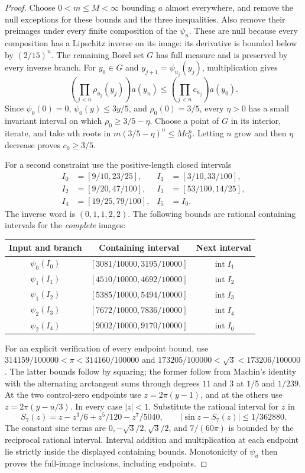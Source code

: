 \documentclass[11pt,reqno]{amsart}
\numberwithin{equation}{section}
\theoremstyle{definition}
\newcommand{\intr}{\operatorname{int}}
\begin{document}
\begin{proof}
Choose $0<m\le M<\infty$ bounding $a$ almost everywhere, and
remove the null exceptions for these bounds and the three inequalities.
Also remove their preimages under every finite composition of the
$\psi_u$. These are null because every composition has a Lipschitz
inverse on its image: its derivative is bounded below by
$(2/15)^n$. The remaining Borel set $G$ has full measure and is
preserved by every inverse branch. For $y_0\in G$ and
$y_{j+1}=\psi_{u_j}(y_j)$, multiplication gives
\begin{equation}\label{eq:density-iterate}
 \left(\prod_{j<n}\rho_{u_j}(y_j)\right)a(y_n)
 \le\left(\prod_{j<n}c_{u_j}\right)a(y_0).
\end{equation}
Since $\psi_0(0)=0$, $\psi_0(y)\le3y/5$, and
$\rho_0(0)=3/5$, every $\eta>0$ has a small invariant interval
on which $\rho_0\ge3/5-\eta$. Choose a point of $G$ in its
interior, iterate, and take $n$th roots in
$m(3/5-\eta)^n\le Mc_0^n$. Letting $n$ grow and then
$\eta$ decrease proves $c_0\ge3/5$.

For a second constraint use the positive-length closed intervals
\begin{align*}
 I_0&=[9/10,23/25],& I_1&=[3/10,33/100],\\
 I_2&=[9/20,47/100],& I_3&=[53/100,14/25],\\
 I_4&=[19/25,79/100],& I_5&=I_0.
\end{align*}
The inverse word is $(0,1,1,2,2)$. The following bounds are
rational containing intervals for the \emph{complete} images:
\begin{center}
\begin{tabular}{ccc}
\toprule
Input and branch&Containing interval&Next interval\\
\midrule
$\psi_0(I_0)$&$[3081/10000,3195/10000]$&$\intr I_1$\\
$\psi_1(I_1)$&$[4510/10000,4692/10000]$&$\intr I_2$\\
$\psi_1(I_2)$&$[5385/10000,5494/10000]$&$\intr I_3$\\
$\psi_2(I_3)$&$[7672/10000,7836/10000]$&$\intr I_4$\\
$\psi_2(I_4)$&$[9002/10000,9170/10000]$&$\intr I_0$\\
\bottomrule
\end{tabular}
\end{center}
For an explicit verification of every endpoint bound, use
$314159/100000<\pi<314160/100000$ and
$173205/100000<\sqrt3<173206/100000$.
The latter bounds follow by squaring; the former follow from
Machin's identity with the alternating arctangent sums through
degrees $11$ and $3$ at $1/5$ and $1/239$.
At the two control-zero endpoints use $z=2\pi(y-1)$, and at
the others use $z=2\pi(y-u/3)$. In every case $|z|<1$.
Substitute the rational interval for $z$ in
\[
 S_7(z)=z-z^3/6+z^5/120-z^7/5040,\qquad
 |\sin z-S_7(z)|\le1/362880.
\]
The constant sine terms are $0,-\sqrt3/2,\sqrt3/2$, and
$7/(60\pi)$ is bounded by the reciprocal rational interval.
Interval addition and multiplication at each endpoint lie strictly
inside the displayed containing bounds. Monotonicity of $\psi_u$
then proves the full-image inclusions, including endpoints.


\end{proof}
\end{document}
